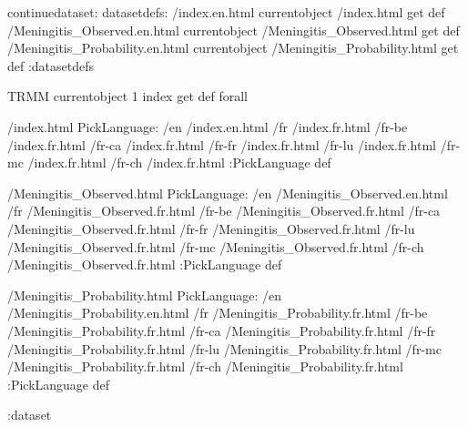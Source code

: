 \begin{ingrid}
continuedataset:
datasetdefs:
/index.en.html currentobject /index.html get def
/Meningitis_Observed.en.html currentobject /Meningitis_Observed.html get def
/Meningitis_Probability.en.html currentobject /Meningitis_Probability.html get def
:datasetdefs

{ TRMM } { currentobject 1 index get def } forall

/index.html {
PickLanguage:
/en /index.en.html
/fr /index.fr.html
/fr-be /index.fr.html
/fr-ca /index.fr.html
/fr-fr /index.fr.html
/fr-lu /index.fr.html
/fr-mc /index.fr.html
/fr-ch /index.fr.html
:PickLanguage
} def

/Meningitis_Observed.html {
PickLanguage:
/en /Meningitis_Observed.en.html
/fr /Meningitis_Observed.fr.html
/fr-be /Meningitis_Observed.fr.html
/fr-ca /Meningitis_Observed.fr.html
/fr-fr /Meningitis_Observed.fr.html
/fr-lu /Meningitis_Observed.fr.html
/fr-mc /Meningitis_Observed.fr.html
/fr-ch /Meningitis_Observed.fr.html
:PickLanguage
} def

/Meningitis_Probability.html {
PickLanguage:
/en /Meningitis_Probability.en.html
/fr /Meningitis_Probability.fr.html
/fr-be /Meningitis_Probability.fr.html
/fr-ca /Meningitis_Probability.fr.html
/fr-fr /Meningitis_Probability.fr.html
/fr-lu /Meningitis_Probability.fr.html
/fr-mc /Meningitis_Probability.fr.html
/fr-ch /Meningitis_Probability.fr.html
:PickLanguage
} def

:dataset
\end{ingrid}
